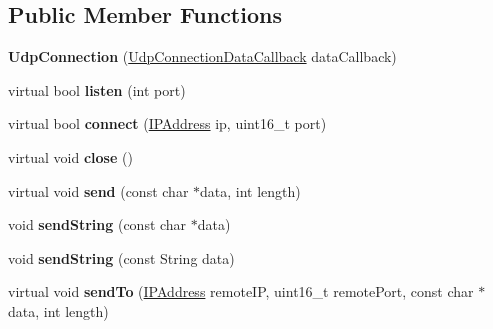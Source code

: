 \subsection*{Public Member Functions}
\begin{DoxyCompactItemize}
\item 
\hypertarget{class_udp_connection_a31debc91cf21d24fd7ed9fe9a2b639d0}{}{\bfseries Udp\+Connection} (\hyperlink{class_delegate}{Udp\+Connection\+Data\+Callback} data\+Callback)\label{class_udp_connection_a31debc91cf21d24fd7ed9fe9a2b639d0}

\item 
\hypertarget{class_udp_connection_abfe99a74324cd41eecec718b676a17e2}{}virtual bool {\bfseries listen} (int port)\label{class_udp_connection_abfe99a74324cd41eecec718b676a17e2}

\item 
\hypertarget{class_udp_connection_ab169ae589e323d1f4017b3b8234725f2}{}virtual bool {\bfseries connect} (\hyperlink{class_i_p_address}{I\+P\+Address} ip, uint16\+\_\+t port)\label{class_udp_connection_ab169ae589e323d1f4017b3b8234725f2}

\item 
\hypertarget{class_udp_connection_aaa4a42e6ed80d5e5d0cd9e6774196104}{}virtual void {\bfseries close} ()\label{class_udp_connection_aaa4a42e6ed80d5e5d0cd9e6774196104}

\item 
\hypertarget{class_udp_connection_a4448a4bb99b0138b61b5b3256b667e2a}{}virtual void {\bfseries send} (const char $\ast$data, int length)\label{class_udp_connection_a4448a4bb99b0138b61b5b3256b667e2a}

\item 
\hypertarget{class_udp_connection_a22aaae5ee7a77001d5041826a47ab112}{}void {\bfseries send\+String} (const char $\ast$data)\label{class_udp_connection_a22aaae5ee7a77001d5041826a47ab112}

\item 
\hypertarget{class_udp_connection_af64a02edc8dd013a75c88965c2899bff}{}void {\bfseries send\+String} (const String data)\label{class_udp_connection_af64a02edc8dd013a75c88965c2899bff}

\item 
\hypertarget{class_udp_connection_aef6148d2435d3dc62ea71340f57abd5a}{}virtual void {\bfseries send\+To} (\hyperlink{class_i_p_address}{I\+P\+Address} remote\+I\+P, uint16\+\_\+t remote\+Port, const char $\ast$data, int length)\label{class_udp_connection_aef6148d2435d3dc62ea71340f57abd5a}


\end{DoxyCompactItemize}
